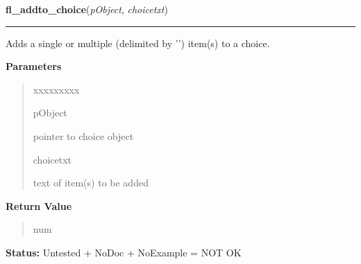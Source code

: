 \hspace{.8\funcindent}\begin{boxedminipage}{\funcwidth}

    \raggedright \textbf{fl\_addto\_choice}(\textit{pObject}, \textit{choicetxt})

    \vspace{-1.5ex}

    \rule{\textwidth}{0.5\fboxrule}
\setlength{\parskip}{2ex}
    Adds a single or multiple (delimited by '{\textbar}') item(s) to a 
    choice.

\setlength{\parskip}{1ex}
      \textbf{Parameters}
      \vspace{-1ex}

      \begin{quote}
        \begin{Ventry}{xxxxxxxxx}

          \item[pObject]

          pointer to choice object

          \item[choicetxt]

          text of item(s) to be added

        \end{Ventry}

      \end{quote}

      \textbf{Return Value}
    \vspace{-1ex}

      \begin{quote}
      num

      \end{quote}

\textbf{Status:} Untested + NoDoc + NoExample = NOT OK



    \end{boxedminipage}

    \label{xformslib:library:fl_replace_choice}

    \vspace{0.5ex}

